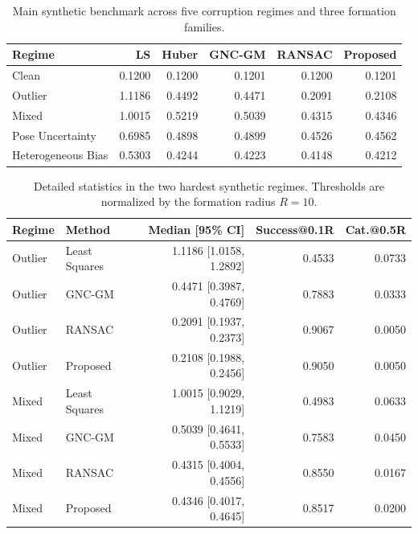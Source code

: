 \begin{table}[!htbp]
\centering
\caption{Main synthetic benchmark across five corruption regimes and three formation families.}
\label{tab:mainregimes}
\begin{tabular}{lrrrrr}
\toprule
Regime & LS & Huber & GNC-GM & RANSAC & Proposed \\
\midrule
Clean                & 0.1200 & 0.1200 & 0.1201 & 0.1200 & 0.1201 \\
Outlier              & 1.1186 & 0.4492 & 0.4471 & 0.2091 & 0.2108 \\
Mixed                & 1.0015 & 0.5219 & 0.5039 & 0.4315 & 0.4346 \\
Pose Uncertainty     & 0.6985 & 0.4898 & 0.4899 & 0.4526 & 0.4562 \\
Heterogeneous Bias   & 0.5303 & 0.4244 & 0.4223 & 0.4148 & 0.4212 \\
\bottomrule
\end{tabular}
\end{table}

\begin{table}[!htbp]
\centering
\caption{Detailed statistics in the two hardest synthetic regimes. Thresholds are normalized by the formation radius $R=10$.}
\label{tab:hardregimes}
\small
\begin{tabular}{llrrr}
\toprule
Regime & Method & Median [95\% CI] & Success@0.1R & Cat.@0.5R \\
\midrule
Outlier & Least Squares & 1.1186 [1.0158, 1.2892] & 0.4533 & 0.0733 \\
Outlier & GNC-GM        & 0.4471 [0.3987, 0.4769] & 0.7883 & 0.0333 \\
Outlier & RANSAC        & 0.2091 [0.1937, 0.2373] & 0.9067 & 0.0050 \\
Outlier & Proposed      & 0.2108 [0.1988, 0.2456] & 0.9050 & 0.0050 \\
\midrule
Mixed   & Least Squares & 1.0015 [0.9029, 1.1219] & 0.4983 & 0.0633 \\
Mixed   & GNC-GM        & 0.5039 [0.4641, 0.5533] & 0.7583 & 0.0450 \\
Mixed   & RANSAC        & 0.4315 [0.4004, 0.4556] & 0.8550 & 0.0167 \\
Mixed   & Proposed      & 0.4346 [0.4017, 0.4645] & 0.8517 & 0.0200 \\
\bottomrule
\end{tabular}
\end{table}
